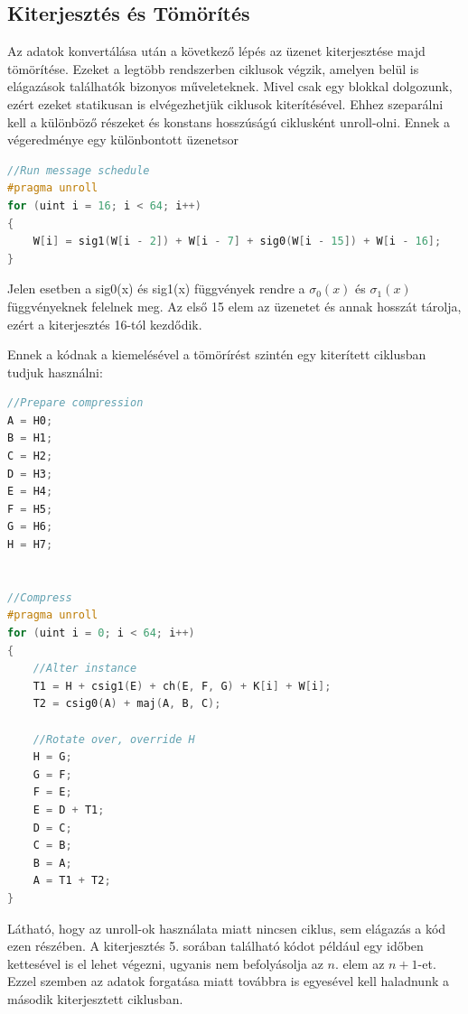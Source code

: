 \subsection{Kiterjesztés és Tömörítés}


Az adatok konvertálása után a következő lépés az üzenet kiterjesztése majd tömörítése. Ezeket a legtöbb rendszerben ciklusok végzik, amelyen belül is elágazások találhatók bizonyos műveleteknek. Mivel csak egy blokkal dolgozunk, ezért ezeket statikusan is elvégezhetjük ciklusok kiterítésével. Ehhez szeparálni kell a különböző részeket és konstans hosszúságú ciklusként unroll-olni. Ennek a végeredménye egy különbontott üzenetsor

\begin{lstlisting}[language={C++}]
//Run message schedule
#pragma unroll
for (uint i = 16; i < 64; i++)
{
    W[i] = sig1(W[i - 2]) + W[i - 7] + sig0(W[i - 15]) + W[i - 16];
}
\end{lstlisting}


Jelen esetben a sig0(x) és sig1(x) függvények rendre a $\sigma_0(x)$ és $\sigma_1(x)$ függvényeknek felelnek meg. Az első 15 elem az üzenetet és annak hosszát tárolja, ezért a kiterjesztés 16-tól kezdődik.

Ennek a kódnak a kiemelésével a tömörírést szintén egy kiterített ciklusban tudjuk használni:

\begin{lstlisting}[language={C++}]
//Prepare compression
A = H0;
B = H1;
C = H2;
D = H3;
E = H4;
F = H5;
G = H6;
H = H7;


//Compress
#pragma unroll
for (uint i = 0; i < 64; i++)
{
    //Alter instance
    T1 = H + csig1(E) + ch(E, F, G) + K[i] + W[i];
    T2 = csig0(A) + maj(A, B, C);

    //Rotate over, override H
    H = G;
    G = F;
    F = E;
    E = D + T1;
    D = C;
    C = B;
    B = A;
    A = T1 + T2;
}
\end{lstlisting}

Látható, hogy az unroll-ok használata miatt nincsen ciklus, sem elágazás a kód ezen részében. A kiterjesztés 5. sorában található kódot például egy időben kettesével is el lehet végezni, ugyanis nem befolyásolja az $n.$ elem az $n+1$-et. Ezzel szemben az adatok forgatása miatt továbbra is egyesével kell haladnunk a második kiterjesztett ciklusban.



